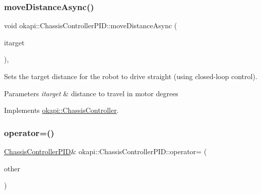 \subsubsection{\texorpdfstring{moveDistanceAsync()}{moveDistanceAsync()}\hspace{0.1cm}{\footnotesize\ttfamily [2/2]}}
{\footnotesize\ttfamily void okapi\+::\+Chassis\+Controller\+P\+I\+D\+::move\+Distance\+Async (\begin{DoxyParamCaption}\item[{double}]{itarget }\end{DoxyParamCaption})\hspace{0.3cm}{\ttfamily [override]}, {\ttfamily [virtual]}}

Sets the target distance for the robot to drive straight (using closed-\/loop control).


\begin{DoxyParams}{Parameters}
{\em itarget} & distance to travel in motor degrees \\
\hline
\end{DoxyParams}


Implements \mbox{\hyperlink{classokapi_1_1ChassisController_a24b46ec1c42f32c0527d57738a07820a}{okapi\+::\+Chassis\+Controller}}.

\mbox{\label{classokapi_1_1ChassisControllerPID_ad3c879b42ad7f5a0d05b2799a9e5c3dd}} 
\subsubsection{\texorpdfstring{operator=()}{operator=()}\hspace{0.1cm}{\footnotesize\ttfamily [1/2]}}
{\footnotesize\ttfamily \mbox{\hyperlink{classokapi_1_1ChassisControllerPID}{Chassis\+Controller\+P\+ID}}\& okapi\+::\+Chassis\+Controller\+P\+I\+D\+::operator= (\begin{DoxyParamCaption}\item[{const \mbox{\hyperlink{classokapi_1_1ChassisControllerPID}{Chassis\+Controller\+P\+ID}} \&}]{other }\end{DoxyParamCaption})\hspace{0.3cm}{\ttfamily [delete]}}

\mbox{\label{classokapi_1_1ChassisControllerPID_a395bac44038870d7aeae2a950e675617}} 
